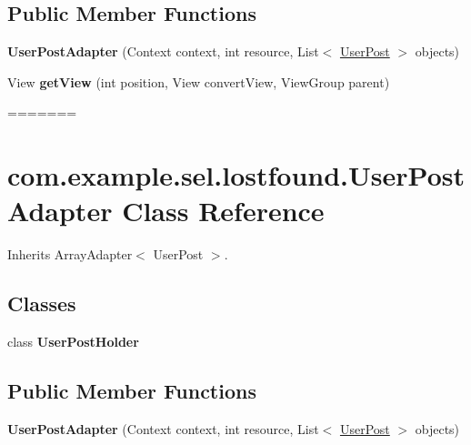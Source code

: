 \subsection*{Public Member Functions}
\begin{DoxyCompactItemize}
\item 
\hypertarget{classcom_1_1example_1_1sel_1_1lostfound_1_1UserPostAdapter_a8770784429d0552a7472193206396700}{{\bfseries User\-Post\-Adapter} (Context context, int resource, List$<$ \hyperlink{classcom_1_1example_1_1sel_1_1lostfound_1_1UserPost}{User\-Post} $>$ objects)}\label{classcom_1_1example_1_1sel_1_1lostfound_1_1UserPostAdapter_a8770784429d0552a7472193206396700}

\item 
\hypertarget{classcom_1_1example_1_1sel_1_1lostfound_1_1UserPostAdapter_ab3b3a8f8ee3bb0bf9a8a863209009395}{View {\bfseries get\-View} (int position, View convert\-View, View\-Group parent)}\label{classcom_1_1example_1_1sel_1_1lostfound_1_1UserPostAdapter_ab3b3a8f8ee3bb0bf9a8a863209009395}
=======
\hypertarget{classcom_1_1example_1_1sel_1_1lostfound_1_1UserPostAdapter}{\section{com.\-example.\-sel.\-lostfound.\-User\-Post\-Adapter \-Class \-Reference}
\label{classcom_1_1example_1_1sel_1_1lostfound_1_1UserPostAdapter}
}


\-Inherits \-Array\-Adapter$<$ User\-Post $>$.

\subsection*{\-Classes}
\begin{DoxyCompactItemize}
\item 
class {\bfseries \-User\-Post\-Holder}
\end{DoxyCompactItemize}
\subsection*{\-Public \-Member \-Functions}
\begin{DoxyCompactItemize}
\item 
\hypertarget{classcom_1_1example_1_1sel_1_1lostfound_1_1UserPostAdapter_a8770784429d0552a7472193206396700}{{\bfseries \-User\-Post\-Adapter} (\-Context context, int resource, \-List$<$ \hyperlink{classcom_1_1example_1_1sel_1_1lostfound_1_1UserPost}{\-User\-Post} $>$ objects)}\label{classcom_1_1example_1_1sel_1_1lostfound_1_1UserPostAdapter_a8770784429d0552a7472193206396700}


\end{DoxyCompactItemize}
\end{DoxyCompactItemize}
